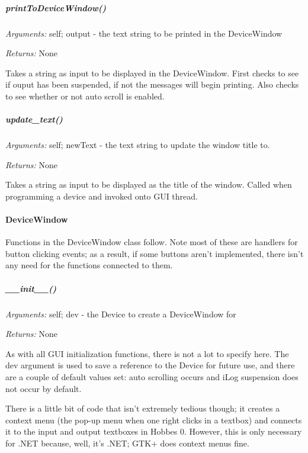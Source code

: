 \documentclass[12pt,letterpaper]{article}
\begin{document}
%
%
\subparagraph{printToDeviceWindow()}
\label{4.3.1.2.7}

\emph{Arguments:} self; output - the text string to be printed in the DeviceWindow

\emph{Returns:} None

Takes a string as input to be displayed in the DeviceWindow.  First checks to see if ouput has been suspended, if not the messages will begin printing.  Also checks to see whether or not auto scroll is enabled.

%
%
\subparagraph{update\_text()}
\label{4.3.1.2.8}

\emph{Arguments:} self; newText - the text string to update the window title to.

\emph{Returns:} None

Takes a string as input to be displayed as the title of the window.  Called when programming a device and invoked onto GUI thread.


%
%
\paragraph{DeviceWindow}
\label{4.3.1.3}

Functions in the DeviceWindow class follow. Note most of these are handlers for button clicking events; as a result, if some buttons aren't implemented, there isn't any need for the functions connected to them.

\setcounter{subparagraph}{-1}



%
%
\subparagraph{\_\_init\_\_()}
\label{4.3.1.3.0}

\emph{Arguments:} self; dev - the Device to create a DeviceWindow for

\emph{Returns:} None

As with all GUI initialization functions, there is not a lot to specify here. The dev argument is used to save a reference to the Device for future use, and there are a couple of default values set: auto scrolling occurs and iLog suspension does not occur by default.

There is a little bit of code that isn't extremely tedious though; it creates a context menu (the pop-up menu when one right clicks in a textbox) and connects it to the input and output textboxes in Hobbes 0. However, this is only necessary for .NET because, well, it's .NET; GTK+ does context menus fine.
\end{document}
